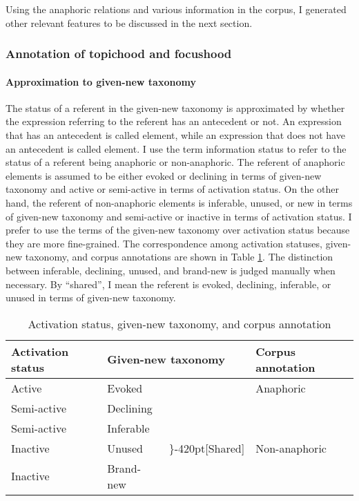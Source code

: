 Using the anaphoric relations and various information in the corpus,
I generated other relevant features to be discussed in the next section.

\subsubsection{Annotation of topichood and focushood}\label{FW:Cor:TopFoc}

\paragraph{Approximation to given-new taxonomy}

The status of a referent in the given-new taxonomy is approximated by
whether the expression referring to the referent has an antecedent or not.
An expression that has an antecedent is called  element,
while an expression that does not have an antecedent is called  element.
I use the term information status to refer to the status of a referent being anaphoric or non-anaphoric.
The referent of anaphoric elements is assumed to be either evoked or declining in terms of given-new taxonomy and active or semi-active in terms of activation status.
On the other hand, the referent of non-anaphoric elements is inferable, unused, or new in terms of given-new taxonomy and
semi-active or inactive in terms of activation status.
I prefer to use the terms of the given-new taxonomy over activation status because
they are more fine-grained.
The correspondence among activation statuses, given-new taxonomy, and corpus annotations are shown in Table \ref{ActStatusCorpus}.
The distinction between inferable, declining, unused, and brand-new is judged manually when necessary.
By ``shared'', I mean the referent is evoked, declining, inferable, or unused in terms of given-new taxonomy.

\begin{table}
	\caption{Activation status, given-new taxonomy, and corpus annotation}
	\label{ActStatusCorpus}
	\begin{center}
	\begin{tabular}{llll}
	\toprule
	Activation status & \multicolumn{2}{l}{Given-new taxonomy} & Corpus annotation \\
	\midrule
	Active & Evoked & & Anaphoric \\
	Semi-active & Declining &  & \\
	\rowcolor{gray}
	Semi-active & Inferable &  & \\
	\rowcolor{gray}
	Inactive & Unused & \rdelim\}{-4}{20pt}[Shared] & Non-anaphoric \\
	\rowcolor{gray}
	Inactive & Brand-new & &  \\
	\bottomrule
	\end{tabular}\\
	\end{center}
\end{table}


